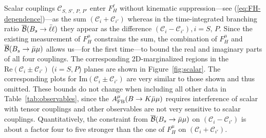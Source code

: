 \documentclass[twocolumn,epjc3]{svjour3}
\numberwithin{equation}{section}
\def \refeq#1{(\ref{#1})}
\def \reffig#1{Figure~\ref{#1}}
\def \reftab#1{Table~\ref{#1}}
\newcommand{\wilson}[2][{}]{\mathcal{C}_{#2}^{\mathrm{#1}}}
\renewcommand{\[}{\big[}
\renewcommand{\]}{\big]}
\renewcommand{\(}{\big(}
\renewcommand{\)}{\big)}
\begin{document}
Scalar couplings $\wilson{S,\, S',\, P,\, P'}$ enter $F_H^\ell$
without kinematic suppression---see \refeq{eq:FH-dependence}---as the
sum $(\wilson{i} + \wilson{i'})$ whereas in the time-integrated
branching ratio $\overline{\cal B}(B_s\to \bar\ell\ell)$ they appear
as the difference $(\wilson{i} - \wilson{i'}), i = S,\, P$.  Since the
existing measurement of $F_H^\mu$ constrains the sum, the combination
of $F_H^\mu$ and $\overline{\cal B}(B_s \to \bar\mu\mu)$ allows
us---for the first time---to bound the real and imaginary parts of all
four couplings.  The corresponding 2D-marginalized regions in the
$\mbox{Re}(\wilson{i} \pm \wilson{i'})$ ($i = S, P$) planes are shown
in \reffig{fig:scalar}. The corresponding plots for
$\mbox{Im}(\wilson{i} \pm \wilson{i'})$ are very similar to those
shown and thus omitted. These bounds do not change when including all
other data in \reftab{tab:observables}, since the $A_{\rm FB}^\mu(B\to
K\bar\mu\mu)$ requires interference of scalar with tensor couplings
and other observables are not very sensitive to scalar
couplings. Quantitatively, the constraint from $\overline{\cal B} (B_s
\to \bar\mu\mu)$ on $(\wilson{i} - \wilson{i'})$ is about a factor
four to five stronger than the one of $F_H^\mu$ on $(\wilson{i} +
\wilson{i'})$.
\end{document}

